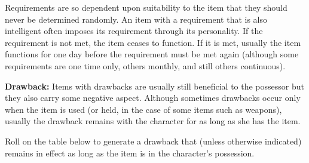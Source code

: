 Requirements are so dependent upon suitability to the item that they should never be determined randomly. An item with a requirement that is also intelligent often imposes its requirement through its personality. If the requirement is not met, the item ceases to function. If it is met, usually the item functions for one day before the requirement must be met again (although some requirements are one time only, others monthly, and still others continuous).

\textbf{Drawback:} Items with drawbacks are usually still beneficial to the possessor but they also carry some negative aspect. Although sometimes drawbacks occur only when the item is used (or held, in the case of some items such as weapons), usually the drawback remains with the character for as long as she has the item.

Roll on the table below to generate a drawback that (unless otherwise indicated) remains in effect as long as the item is in the character's possession.

